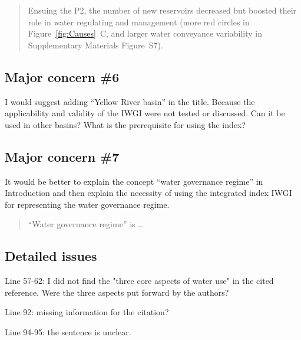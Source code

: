 \begin{quote}
	Ensuing the P2, the number of new reservoirs decreased but boosted their role in water regulating and management (more red circles in Figure~\ref{fig:Causes}~C, and larger water conveyance variability in Supplementary Materials Figure~S7).  %
\end{quote}

\subsection{Major concern \#6}
\RC{} I would suggest adding ``Yellow River basin'' in the title. Because the applicability and validity of the IWGI were not tested or discussed. Can it be used in other basins? What is the prerequisite for using the index?




\subsection{Major concern \#7}
\RC{} It would be better to explain the concept ``water governance regime'' in Introduction and then explain the necessity of using the integrated index IWGI for representing the water governance regime.

\begin{quote}
	``Water governance regime'' is \ldots
\end{quote}

\subsection{Detailed issues}

\RC{} Line 57-62: I did not find the "three core aspects of water use" in the cited reference. Were the three aspects put forward by the authors?

\RC{} Line 92: missing information for the citation?

\RC{} Line 94-95: the sentence is unclear.


